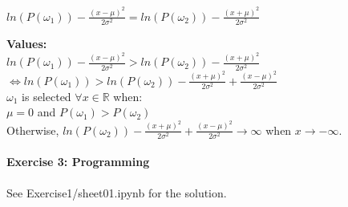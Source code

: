 \documentclass{article}
\begin{document}
\begin{description}
\begin{description}
$ln(P(\omega_1)) - \frac{(x-\mu)^2}{2\sigma^2} = ln(P(\omega_2)) - \frac{(x+\mu)^2}{2\sigma^2}$ 

\vspace{0.3cm} 

\item \textbf{Values:} \\

$ln(P(\omega_1)) - \frac{(x-\mu)^2}{2\sigma^2} > ln(P(\omega_2)) - \frac{(x+\mu)^2}{2\sigma^2}$ \\

$\Leftrightarrow ln(P(\omega_1)) > ln(P(\omega_2)) - \frac{(x+\mu)^2}{2\sigma^2} + \frac{(x-\mu)^2}{2\sigma^2}$ \\

$\omega_1$ is selected $\forall x \in \mathbb{R}$ when: \\

$\mu = 0$ and  $P(\omega_1) > P(\omega_2)$ \\

Otherwise, $ln(P(\omega_2)) - \frac{(x+\mu)^2}{2\sigma^2} + \frac{(x-\mu)^2}{2\sigma^2} \rightarrow \infty $ when $x \rightarrow -\infty$.

\end{description}

\end{description}

\paragraph{Exercise 3: Programming}

See Exercise1/sheet01.ipynb for the solution.
\end{document}
